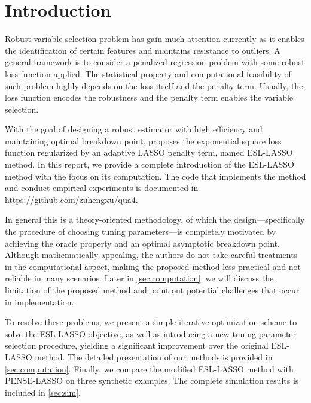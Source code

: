 \section{Introduction} \label{sec:intro}
Robust variable selection problem has  gain much attention currently as it enables the identification of certain features and maintains resistance to outliers. A general framework is to consider a penalized regression problem with some robust loss function applied. The statistical property and computational feasibility of such problem highly depends on the loss itself and the penalty term. Usually, the loss function encodes the robustness and the penalty term enables the variable selection. 


With the goal of designing a robust estimator with high efficiency and maintaining optimal breakdown point, \citet{wang2013robust} proposes the exponential square loss function regularized by an adaptive LASSO penalty term, named ESL-LASSO method. 
In this report, we provide a complete introduction of the ESL-LASSO method with the focus on its computation. The code that implements the method and conduct empirical experiments is documented in \url{https://github.com/zuhengxu/qua4}.


In general this is a theory-oriented methodology, of which the design---specifically the procedure of choosing tuning parameters---is completely motivated by achieving the oracle property \citep{fan2001variable} and an optimal  asymptotic breakdown point. Although mathematically appealing,  the authors do not take careful treatments in the computational aspect, making the proposed method less practical and not reliable in many scenarios. Later in \cref{sec:computation}, we will discuss the limitation of the proposed method and point out potential challenges that occur in implementation. 



To resolve these problems, we present a simple iterative optimization scheme to solve the ESL-LASSO objective, as well as introducing a new tuning parameter selection procedure, yielding a significant improvement over the original ESL-LASSO method. 
The detailed presentation of our methods is provided in \cref{sec:computation}.
Finally, we compare the modified ESL-LASSO method with PENSE-LASSO \citep{freue2019robust} on three synthetic examples. The complete simulation results is included in \cref{sec:sim}.
